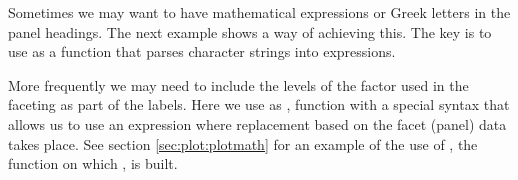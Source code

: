 \documentclass[krantz2]{krantz}\usepackage{knitr}
\begin{document}
\begin{explainbox}
Sometimes we may want to have mathematical expressions or Greek letters in the panel headings. The next example shows a way of achieving this. The key is to use as  a function that parses character strings into \Rlang expressions.

\begin{knitrout}\footnotesize
{}\color{fgcolor}\begin{kframe}
\begin{alltt}
\hlopt{$} \hlkwb{<-} \hlopt{$}
                        \hlstd{=} \hlstd{(}\hlstd{,} \hlstd{,} \hlstd{))}
 \hlkwb{<-} \hlstd{(}   \hlopt{+}
      \hlstd{()} \hlopt{+}
      \hlstd{(} \hlstd{=}   
\end{alltt}
\end{kframe}
\end{knitrout}

More frequently we may need to include the levels of the factor used in the faceting as part of the labels. Here we use as , function  with a special syntax that allows us to use an expression where replacement based on the facet (panel) data takes place. See section \ref{sec:plot:plotmath} for an example of the use of , the \Rlang function on which , is built.



\begin{knitrout}\footnotesize
{}\color{fgcolor}\begin{kframe}
\begin{alltt}
 \hlopt{+}
  \hlstd{(} \hlstd{=} 
              \hlstd{=} \hlstd{(} \hlstd{=} \hlopt{~}\hlstd{))}
\end{alltt}
\end{kframe}
\end{knitrout}

\end{explainbox}
\end{document}
